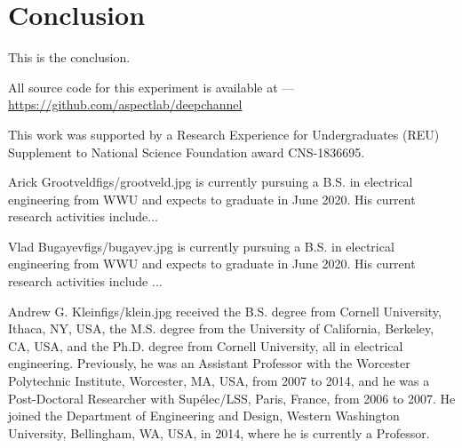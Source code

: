 \documentclass[twocolumn,letterpaper]{IEEEAerospaceCLS}  %
\begin{document}
\section{Conclusion}
\label{sec:conclusion}
This is the conclusion.



All source code for this experiment is available at ---\\
\url{https://github.com/aspectlab/deepchannel}




\acknowledgments
This work was supported by a Research Experience for Undergraduates
(REU) Supplement to National Science Foundation award CNS-1836695.


\newpage



\newpage
\thebiography
\begin{biographywithpic}
{Arick Grootveld}{figs/grootveld.jpg}
is currently pursuing a B.S. in electrical engineering from WWU and expects to graduate in June 2020. His current research activities include... 
\lipsum[1-1]
\end{biographywithpic}

\begin{biographywithpic}
{Vlad Bugayev}{figs/bugayev.jpg}
is currently pursuing a B.S. in electrical engineering from WWU and expects to graduate in June 2020. His current research activities include ...
\lipsum[1-1]
\end{biographywithpic}

\begin{biographywithpic}
{Andrew G. Klein}{figs/klein.jpg}
received the B.S. degree from Cornell University, Ithaca,
NY, USA, the M.S. degree from the University of
California, Berkeley, CA, USA, and the Ph.D.
degree from Cornell University, all in electrical
engineering. Previously, he was an Assistant Professor with the Worcester Polytechnic Institute,
Worcester, MA, USA, from 2007 to 2014, and he
was a Post-Doctoral Researcher with Sup\'{e}lec/LSS,
Paris, France, from 2006 to 2007. He joined the
Department of Engineering and Design, Western
Washington University, Bellingham, WA, USA, in 2014, where he is currently
a Professor.
\end{biographywithpic}
\end{document}
